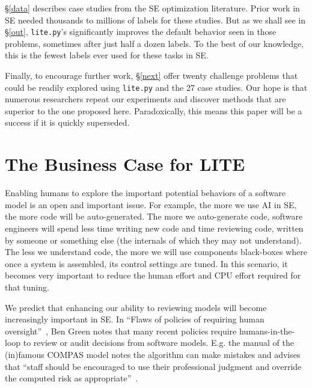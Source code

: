     \S\ref{data} describes  case studies from the SE optimization literature. Prior work in SE needed  thousands to millions of labels for these   studies.
    But as we shall see in \S\ref{out},  \verb+lite.py+'s       significantly improves the default
    behavior seen in those problems, sometimes after  just half a dozen labels.
    To the best of
our knowledge, this is the fewest   labels ever used for these tasks in SE.

  Finally, to encourage further work,   \S\ref{next}   offer twenty challenge problems that could be readily explored using \verb+lite.py+ and the 27 case studies.
Our hope is that numerous researchers repeat our experiments and discover
methods that are superior to the one proposed here. Paradoxically, this means
this paper will be a success if it is quickly superseded.

\section{The Business Case for LITE}\label{why}



Enabling humans to explore  the important potential behaviors of a software model is an open and important  issue. 
For example,
the more we use AI in SE, the more code will be auto-generated.
The more we auto-generate code,    software engineers will   spend less
time  writing new code and time
reviewing code, written by someone or something else (the internals of which they may not understand).
The less we  
understand code, 
the more we will use components  black-boxes  
  where once a system is assembled, its control settings
are tuned.  
In this scenario, it becomes very  important to reduce
the human effort and CPU effort required for that tuning.


We predict that enhancing our ability to reviewing models will become increasingly important in SE.
In  
``Flaws of policies of requiring human oversight''~\cite{green2022flaws},
Ben Green notes that many recent policies      require humans-in-the-loop to review or   audit   decisions from software models. 
E.g. the  manual of the
(in)famous  COMPAS model notes the algorithm can make mistakes and advises that 
``staff should be encouraged to use their professional judgment and override the computed risk as appropriate''~\cite{northe15}. 

